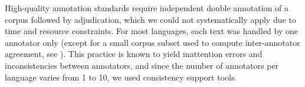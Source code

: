 \documentclass[output=paper,modfonts]{langscibook}
\begin{document}
High-quality annotation standards require independent double annotation of a corpus followed by adjudication, which we could not systematically apply due to time and resource constraints. For most languages, each text was handled by one annotator only (except for a small corpus subset used to compute inter-annotator agreement, see ). 
This practice is known %
to yield inattention errors and inconsistencies between annotators, and since the number of annotators per language varies from 1 to 10, we used consistency support tools.

\end{document}
